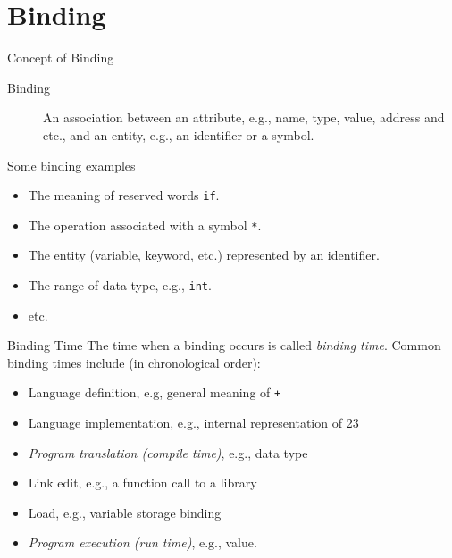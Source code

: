 \documentclass[presentation]{beamer}
\begin{document}
\section{Binding}
\label{sec:orgheadline21}

\begin{frame}[fragile,label={sec:orgheadline15}]{Concept of Binding}
 \begin{description}
\item[{Binding}] An association between an attribute, e.g., name, type,
value, address and etc., and an entity, e.g., an identifier or
a symbol.
\end{description}

Some binding examples

\begin{itemize}
\item The meaning of reserved words \texttt{if}.
\item The operation associated with a symbol \texttt{*}.
\item The entity (variable, keyword, etc.) represented by an identifier.
\item The range of data type, e.g., \texttt{int}.
\item etc.
\end{itemize}
\end{frame}

\begin{frame}[fragile,label={sec:orgheadline16}]{Binding Time}
 The time when a binding occurs is called \emph{binding time}.  Common
binding times include (in chronological order):

\begin{itemize}
\item Language definition, e.g, general meaning of \texttt{+}
\item Language implementation, e.g., internal representation of 23
\item \emph{Program translation (compile time)}, e.g., data type
\item Link edit, e.g., a function call to a library
\item Load, e.g., variable storage binding
\item \emph{Program execution (run time)}, e.g., value.
\end{itemize}
\end{frame}
\end{document}
